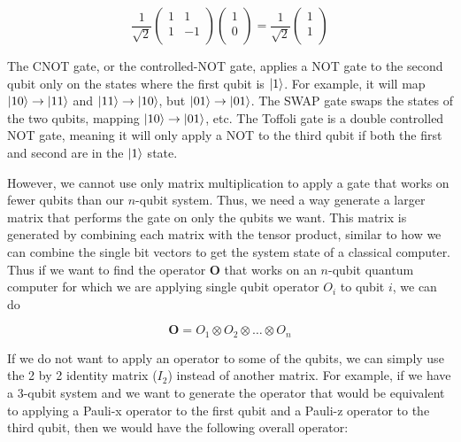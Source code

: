 \documentclass[11pt]{report}
\newcommand{\?}{\stackrel{?}{=}}
\begin{document}
$$\frac{1}{\sqrt{2}}\begin{pmatrix}
1 & 1 \\
1 & -1 \\
\end{pmatrix} \begin{pmatrix}
1 \\
0 \\
\end{pmatrix} = \frac{1}{\sqrt{2}} \begin{pmatrix}
1 \\
1 \\
\end{pmatrix}$$

The CNOT gate, or the controlled-NOT gate, applies a NOT gate to the second qubit only on the states where the first qubit is $\ket{1}$. For example, it will map $\ket{10} \to \ket{11}$ and $\ket{11} \to \ket{10}$, but $\ket{01} \to \ket{01}$. The SWAP gate swaps the states of the two qubits, mapping $\ket{10} \to \ket{01}$, etc. The Toffoli gate is a double controlled NOT gate, meaning it will only apply a NOT to the third qubit if both the first and second are in the $\ket{1}$ state.

However, we cannot use only matrix multiplication to apply a gate that works on fewer qubits than our $n$-qubit system. Thus, we need a way generate a larger matrix that performs the gate on only the qubits we want. This matrix is generated by combining each matrix with the tensor product, similar to how we can combine the single bit vectors to get the system state of a classical computer. Thus if we want to find the operator $\mathbf{O}$ that works on an $n$-qubit quantum computer for which we are applying single qubit operator $O_i$ to qubit $i$, we can do

$$\mathbf{O} = O_1 \otimes O_2 \otimes \ldots \otimes O_n$$

If we do not want to apply an operator to some of the qubits, we can simply use the 2 by 2 identity matrix ($I_2$) instead of another matrix. For example, if we have a 3-qubit system and we want to generate the operator that would be equivalent to applying a Pauli-x operator to the first qubit and a Pauli-z operator to the third qubit, then we would have the following overall operator:
\end{document}
